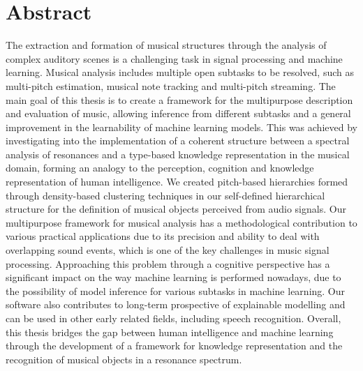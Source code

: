 \chapter*{Abstract}
\label{ch:abstract}


The extraction and formation of musical structures through the analysis of complex auditory scenes is a challenging task in signal processing and machine learning. Musical analysis includes multiple open subtasks to be resolved, such as multi-pitch estimation, musical note tracking and multi-pitch streaming.
The main goal of this thesis is to create a framework for the multipurpose description and evaluation of music, allowing inference from different subtasks and a general improvement in the learnability of machine learning models.
This was achieved by investigating into the implementation of a coherent structure between a spectral analysis of resonances and a type-based knowledge representation in the musical domain, forming an analogy to the perception, cognition and knowledge representation of human intelligence.
We created pitch-based hierarchies formed through density-based clustering techniques in our self-defined hierarchical structure for the definition of musical objects perceived from audio signals.
Our multipurpose framework for musical analysis has a methodological contribution to various practical applications due to its precision and ability to deal with overlapping sound events, which is one of the key challenges in music signal processing.
Approaching this problem through a cognitive perspective has a significant impact on the way machine learning is performed nowadays, due to the possibility of model inference for various subtasks in machine learning. 
Our software also contributes to long-term prospective of explainable modelling and can be used in other early related fields, including speech recognition.
Overall, this thesis bridges the gap between human intelligence and machine learning through the development of a framework for knowledge representation and the recognition of musical objects in a resonance spectrum.